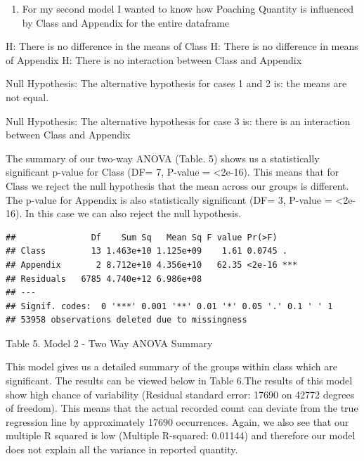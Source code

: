 \documentclass[
  12pt,
]{article}
\providecommand{\tightlist}{%
  \setlength{\itemsep}{0pt}\setlength{\parskip}{0pt}}
\begin{document}
\begin{enumerate}
\def\labelenumi{\arabic{enumi}.}
\setcounter{enumi}{1}
\tightlist
\item
  For my second model I wanted to know how Poaching Quantity is
  influenced by Class and Appendix for the entire dataframe
\end{enumerate}

H: There is no difference in the means of Class H: There is no
difference in means of Appendix H: There is no interaction between Class
and Appendix

Null Hypothesis: The alternative hypothesis for cases 1 and 2 is: the
means are not equal.

Null Hypothesis: The alternative hypothesis for case 3 is: there is an
interaction between Class and Appendix

The summary of our two-way ANOVA (Table. 5) shows us a statistically
significant p-value for Class (DF= 7, P-value = \textless2e-16). This
means that for Class we reject the null hypothesis that the mean across
our groups is different. The p-value for Appendix is also statistically
significant (DF= 3, P-value = \textless2e-16). In this case we can also
reject the null hypothesis.

\begin{verbatim}
##               Df    Sum Sq   Mean Sq F value Pr(>F)    
## Class         13 1.463e+10 1.125e+09    1.61 0.0745 .  
## Appendix       2 8.712e+10 4.356e+10   62.35 <2e-16 ***
## Residuals   6785 4.740e+12 6.986e+08                   
## ---
## Signif. codes:  0 '***' 0.001 '**' 0.01 '*' 0.05 '.' 0.1 ' ' 1
## 53958 observations deleted due to missingness
\end{verbatim}

Table 5. Model 2 - Two Way ANOVA Summary

This model gives us a detailed summary of the groups within class which
are significant. The results can be viewed below in Table 6.The results
of this model show high chance of variability (Residual standard error:
17690 on 42772 degrees of freedom). This means that the actual recorded
count can deviate from the true regression line by approximately 17690
occurrences. Again, we also see that our multiple R squared is low
(Multiple R-squared: 0.01144) and therefore our model does not explain
all the variance in reported quantity.
\end{document}
